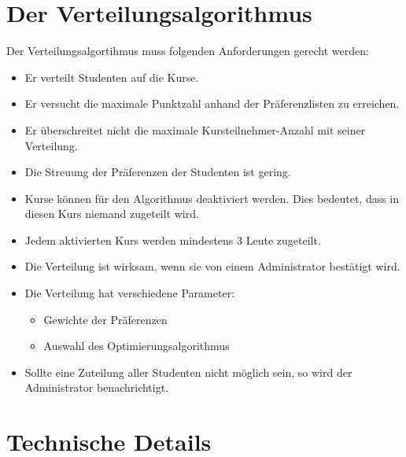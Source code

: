 \documentclass[12pt,a4paper]{article}
\begin{document}
    \section{Der Verteilungsalgorithmus}
    Der Verteilungsalgortihmus muss folgenden Anforderungen gerecht werden:
    \begin{itemize}
	\item Er verteilt Studenten auf die Kurse.
    \item Er versucht die maximale Punktzahl anhand der Präferenzlisten zu erreichen.
    \item Er überschreitet nicht die maximale Kursteilnehmer-Anzahl mit seiner Verteilung.
    \item Die Streuung der Präferenzen der Studenten ist gering.
    \item Kurse können für den Algorithmus deaktiviert werden. Dies bedeutet, dass in diesen Kurs niemand zugeteilt wird.
    \item Jedem aktivierten Kurs werden mindestens 3 Leute zugeteilt.
    \item Die Verteilung ist wirksam, wenn sie von einem Administrator bestätigt wird.
    \item Die Verteilung hat verschiedene Parameter:
    	\begin{itemize}
    	\item Gewichte der Präferenzen
    	\item Auswahl des Optimierungsalgorithmus %
    	\end{itemize}
    \item Sollte eine Zuteilung aller Studenten nicht möglich sein, so wird der Administrator benachrichtigt.
    \end{itemize}
    
    \section{Technische Details}
    
    
\end{document}
